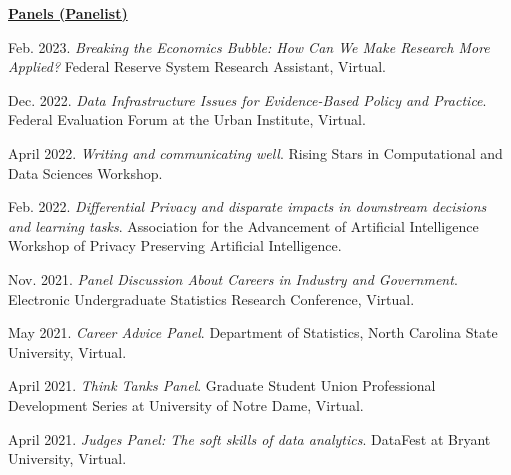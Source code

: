 \begin{etaremune}[topsep=0pt, itemsep=5pt, partopsep=0pt, parsep=0pt]
    \vspace{6pt}
\hspace{-0.30in}\underline{\textbf{\large Panels (Panelist)}}\normalsize
    \item Feb. 2023. \textit{Breaking the Economics Bubble: How Can We Make Research More Applied?} Federal Reserve System Research Assistant, Virtual.
    
    \item Dec. 2022. \textit{Data Infrastructure Issues for Evidence-Based Policy and Practice}. Federal Evaluation Forum at the Urban Institute, Virtual.
    
    \item April 2022. \textit{Writing and communicating well}. Rising Stars in Computational and Data Sciences Workshop.

    \item Feb. 2022. \textit{Differential Privacy and disparate impacts in downstream decisions and learning tasks}. Association for the Advancement of Artificial Intelligence Workshop of Privacy Preserving Artificial Intelligence.
    
    \item Nov. 2021. \textit{Panel Discussion About Careers in Industry and Government}. Electronic Undergraduate Statistics Research Conference, Virtual.

    \item May 2021. \textit{Career Advice Panel}. Department of Statistics, North Carolina State University, Virtual.
    
    \item April 2021. \textit{Think Tanks Panel}. Graduate Student Union Professional Development Series at University of Notre Dame, Virtual.
    
    \item April 2021. \textit{Judges Panel: The soft skills of data analytics}. DataFest at Bryant University, Virtual.
\end{etaremune}
